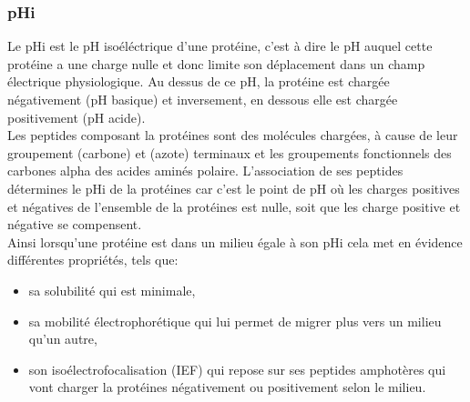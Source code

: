 \subsubsection*{pHi}
Le pHi est le pH isoéléctrique d'une protéine, c'est à dire le pH auquel cette protéine a une charge nulle et donc limite son déplacement dans un champ électrique physiologique.
Au dessus de ce pH, la protéine est chargée négativement (pH basique) et inversement, en dessous elle est chargée positivement (pH acide).\\
Les peptides composant la protéines sont des molécules chargées, à cause de leur groupement  (carbone) et  (azote) terminaux et les groupements fonctionnels des carbones alpha des acides aminés polaire. L'association de ses peptides détermines le pHi de la protéines car c'est le point de pH où les charges positives et négatives de l'ensemble de la protéines est nulle, soit que les charge positive et négative se compensent.\\
Ainsi lorsqu'une protéine est dans un milieu égale à son pHi cela met en évidence différentes propriétés, tels que:
\begin{itemize}
\item sa solubilité qui est minimale,
\item sa mobilité électrophorétique qui lui permet de migrer plus vers un milieu qu'un autre,
\item son isoélectrofocalisation (IEF) qui repose sur ses peptides amphotères qui vont charger la protéines négativement ou positivement selon le milieu.\\
\end{itemize}